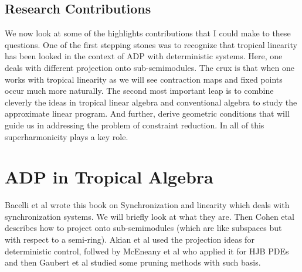 \documentclass{article}
\begin{document}
\subsection{Research Contributions}
We now look at some of the highlights contributions that I could make to these questions. One of the first stepping stones was to recognize that tropical linearity has been looked in the context of ADP with deterministic systems. Here, one deals with different projection onto sub-semimodules. The crux is that when one works with tropical linearity as we will see contraction maps and fixed points occur much more naturally. The second most important leap is to combine cleverly the ideas in tropical linear algebra and conventional algebra to study the approximate linear program. And further, derive geometric conditions that will guide us in addressing the problem of constraint reduction. In all of this superharmonicity plays a key role.

\section{ADP in Tropical Algebra}

Bacelli et al wrote this book on Synchronization and linearity which deals with synchronization systems. We will briefly look at what they are. Then Cohen etal describes how to project onto sub-semimodules (which are like subspaces but with respect to a semi-ring). Akian et al used the projection ideas for deterministic control, follwed by McEneany et al who applied it for HJB PDEs and then Gaubert et al studied some pruning methods with such basis.
\end{document}
